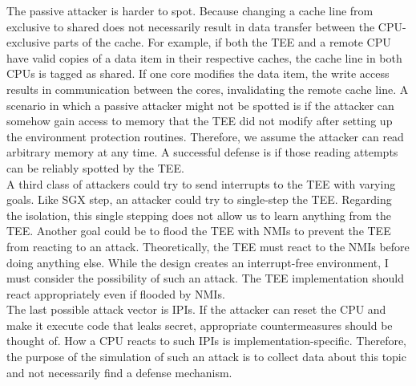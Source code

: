 The passive attacker is harder to spot. Because changing a cache line from
exclusive to shared does not necessarily result in data transfer between the
CPU-exclusive parts of the cache. For example, if both the TEE and a remote CPU
have valid copies of a data item in their respective caches, the cache line in
both CPUs is tagged as shared. If one core modifies the data item, the write
access results in communication between the cores, invalidating the remote cache
line. A scenario in which a passive attacker might not be spotted is if the
attacker can somehow gain access to memory that the TEE did not modify after
setting up the environment protection routines. Therefore, we assume the
attacker can read arbitrary memory at any time. A successful defense is if those
reading attempts can be reliably spotted by the TEE.\\

A third class of attackers could try to send interrupts to the TEE with varying
goals. Like SGX step, an attacker could try to single-step the TEE.
Regarding the isolation, this single stepping does not allow us to learn
anything from the TEE. Another goal could be to flood the TEE with NMIs to
prevent the TEE from reacting to an attack. Theoretically, the TEE must react to
the NMIs before doing anything else. While the design creates an interrupt-free
environment, I must consider the possibility of such an attack. The TEE
implementation should react appropriately even if flooded by NMIs.\\

The last possible attack vector is IPIs. If the attacker can reset the CPU and
make it execute code that leaks secret, appropriate countermeasures should be
thought of. How a CPU reacts to such IPIs is implementation-specific. Therefore,
the purpose of the simulation of such an attack is to collect data about this
topic and not necessarily find a defense mechanism.\\

\cleardoublepage

